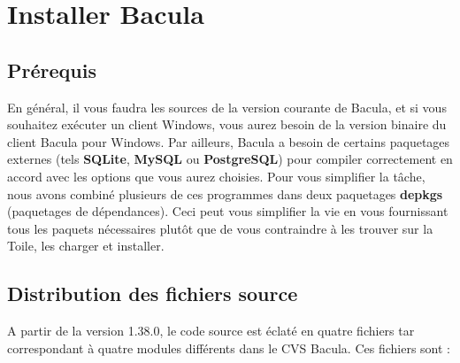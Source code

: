
\chapter{Installer Bacula}
\label{_ChapterStart17}

\section{Pr\'erequis}

En g\'en\'eral, il vous faudra les sources de la version courante de Bacula,
et si vous souhaitez ex\'ecuter un client Windows, vous aurez besoin de la
version binaire du client Bacula pour Windows. Par ailleurs, Bacula a besoin
de certains paquetages externes (tels {\bf SQLite}, {\bf MySQL} ou {\bf
PostgreSQL}) pour compiler correctement en accord avec les options que vous
aurez choisies. Pour vous simplifier la t\^ache, nous avons combin\'e
plusieurs de ces programmes dans deux paquetages {\bf depkgs} (paquetages de
d\'ependances). Ceci peut vous simplifier la vie en vous fournissant tous les
paquets n\'ecessaires plut\^ot que de vous contraindre \`a les trouver sur la
Toile, les charger et installer. 

\section{Distribution des fichiers source}
A partir de la version 1.38.0, le code source est \'eclat\'e en quatre 
fichiers tar correspondant \`a quatre modules diff\'erents dans le CVS 
Bacula. Ces fichiers sont :

